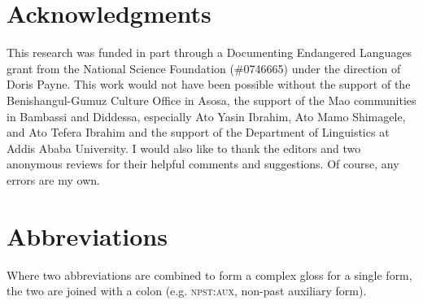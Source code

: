 \documentclass[output=paper]{langsci/langscibook}
\begin{document}
\section*{\textbf{Acknowledgments}}

This research was funded in part through a Documenting Endangered Languages grant from the National Science Foundation (\#0746665) under the direction of Doris Payne. This work would not have been possible without the support of the Benishangul-Gumuz Culture Office in Asosa, the support of the Mao communities in Bambassi and Diddessa, especially Ato Yasin Ibrahim, Ato Mamo Shimagele, and Ato Tefera Ibrahim and the support of the Department of Linguistics at Addis Ababa University. I would also like to thank the editors and two anonymous reviews for their helpful comments and suggestions. Of course, any errors are my own. 

\section*{\textbf{Abbreviations}}

Where two abbreviations are combined to form a complex gloss for a single form, the two are joined with a colon (e.g. \textsc{npst:aux}, non-past auxiliary form). 
\end{document}
